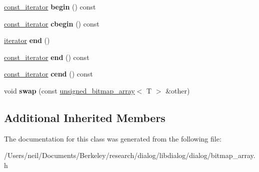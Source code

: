\begin{DoxyCompactItemize}
\hyperlink{classdialog_1_1const__bitmap__array__iterator}{const\+\_\+iterator} {\bfseries begin} () const
\item 
\mbox{\label{classdialog_1_1unsigned__bitmap__array_a3164e4fd90ceca7e70b00f5e33693d12}} 
\hyperlink{classdialog_1_1const__bitmap__array__iterator}{const\+\_\+iterator} {\bfseries cbegin} () const
\item 
\mbox{\label{classdialog_1_1unsigned__bitmap__array_a49aaa3970f574a68d4e30e901599c9c7}} 
\hyperlink{classdialog_1_1bitmap__array__iterator}{iterator} {\bfseries end} ()
\item 
\mbox{\label{classdialog_1_1unsigned__bitmap__array_af25e47ec6f32be461558349229d84cef}} 
\hyperlink{classdialog_1_1const__bitmap__array__iterator}{const\+\_\+iterator} {\bfseries end} () const
\item 
\mbox{\label{classdialog_1_1unsigned__bitmap__array_a88da7a686ed3f8b5d8f0b81fd6602a4b}} 
\hyperlink{classdialog_1_1const__bitmap__array__iterator}{const\+\_\+iterator} {\bfseries cend} () const
\item 
\mbox{\label{classdialog_1_1unsigned__bitmap__array_a3f699e7874ada6827762558eaa542a76}} 
void {\bfseries swap} (const \hyperlink{classdialog_1_1unsigned__bitmap__array}{unsigned\+\_\+bitmap\+\_\+array}$<$ T $>$ \&other)
\end{DoxyCompactItemize}
\subsection*{Additional Inherited Members}


The documentation for this class was generated from the following file\+:\begin{DoxyCompactItemize}
\item 
/\+Users/neil/\+Documents/\+Berkeley/research/dialog/libdialog/dialog/bitmap\+\_\+array.\+h\end{DoxyCompactItemize}
